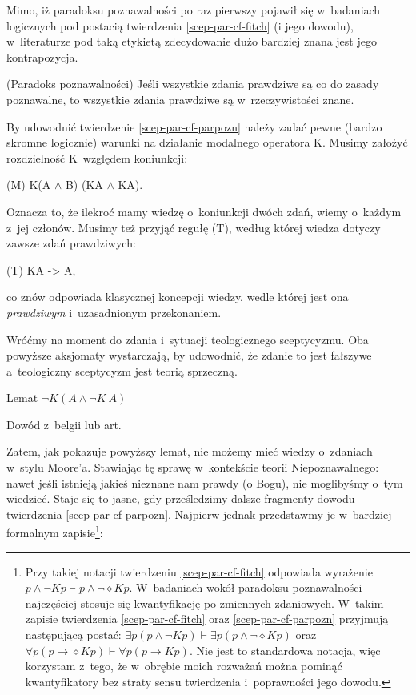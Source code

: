 {Mimo, iż paradoksu poznawalności po raz pierwszy pojawił się w~badaniach logicznych pod postacią twierdzenia \ref{scep-par-cf-fitch} (i jego dowodu), w~literaturze pod taką etykietą zdecydowanie dużo bardziej znana jest jego kontrapozycja.

(Paradoks poznawalności) Jeśli wszystkie zdania prawdziwe są co do zasady poznawalne, to wszystkie zdania prawdziwe są w~rzeczywistości znane.\label{scep-par-cf-parpozn}

By udowodnić twierdzenie \ref{scep-par-cf-parpozn} należy zadać pewne (bardzo skromne logicznie) warunki na działanie modalnego operatora K. Musimy założyć rozdzielność K~względem koniunkcji:

(M) K(A ${\wedge}$ B) (KA ${\wedge}$ KA).

Oznacza to, że ilekroć mamy wiedzę o~koniunkcji dwóch zdań, wiemy o~każdym z~jej członów. Musimy też przyjąć regułę (T), według której wiedza dotyczy zawsze zdań prawdziwych:

(T) KA -{\textgreater} A,

co znów odpowiada klasycznej koncepcji wiedzy, wedle której jest ona \textit{prawdziwym} i~uzasadnionym przekonaniem.

Wróćmy na moment do zdania \label{scep- par-KNT-bis} i~sytuacji teologicznego sceptycyzmu. Oba powyższe aksjomaty wystarczają, by udowodnić, że zdanie to jest fałszywe a~teologiczny sceptycyzm jest teorią sprzeczną.

Lemat $\neg K(A \land \neg K~A)$\label{scep-par-cf-lemat}

Dowód z~belgii lub art.

Zatem, jak pokazuje powyższy lemat, nie możemy mieć wiedzy o~zdaniach w~stylu Moore'a. Stawiając tę sprawę w~kontekście teorii Niepoznawalnego: nawet jeśli istnieją jakieś nieznane nam prawdy (o Bogu), nie moglibyśmy o~tym wiedzieć. Staje się to jasne, gdy prześledzimy dalsze fragmenty dowodu twierdzenia \ref{scep-par-cf-parpozn}. Najpierw jednak przedstawmy je w~bardziej formalnym zapisie\footnote{Przy takiej notacji twierdzeniu \ref{scep-par-cf-fitch} odpowiada wyrażenie $p \land \neg K p \vdash p \land \neg \diamond K p$. W~badaniach wokół paradoksu poznawalności najczęściej stosuje się kwantyfikację po zmiennych zdaniowych. W~takim zapisie twierdzenia \ref{scep-par-cf-fitch} oraz \ref{scep-par-cf-parpozn} przyjmują następującą postać: $\exists p (p \land \neg K p) \vdash \exists p (p \land \neg \diamond K p)$ oraz $\forall p (p \to \diamond K p) \vdash \forall p (p \to K p)$. Nie jest to standardowa notacja, więc korzystam z~tego, że w~obrębie moich rozważań można pominąć kwantyfikatory bez straty sensu twierdzenia i~poprawności jego dowodu.}:

}
